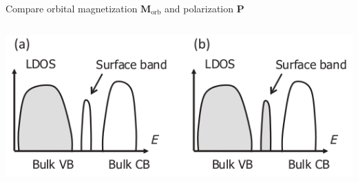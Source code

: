 \documentclass{beamer}
\begin{document}
\begin{frame}{Compare orbital magnetization \(\bm{M}_{\text{orb}}\) and polarization \(\bm{P}\)}
\begin{columns}
        \begin{column}{0.3\textwidth}
          \includegraphics[width=\textwidth]{figure/P-surf.png}
        \end{column}
      \end{columns}
    \end{frame}
\end{document}
